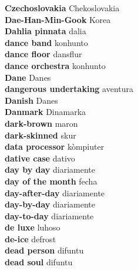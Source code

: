 \textbf{ Czechoslovakia  } Chekoslovakia \\
\textbf{ Dae-Han-Min-Gook  } Korea \\
\textbf{ Dahlia pinnata  } dalia \\
\textbf{ dance band  } konhunto \\
\textbf{ dance floor  } dansflur \\
\textbf{ dance orchestra  } konhunto \\
\textbf{ Dane  } Danes \\
\textbf{ dangerous undertaking  } aventura \\
\textbf{ Danish  } Danes \\
\textbf{ Danmark  } Dinamarka \\
\textbf{ dark-brown  } maron \\
\textbf{ dark-skinned  } skur \\
\textbf{ data processor  } kòmpiuter \\
\textbf{ dative case  } dativo \\
\textbf{ day by day  } diariamente \\
\textbf{ day of the month  } fecha \\
\textbf{ day-after-day  } diariamente \\
\textbf{ day-by-day  } diariamente \\
\textbf{ day-to-day  } diariamente \\
\textbf{ de luxe  } luhoso \\
\textbf{ de-ice  } defrost \\
\textbf{ dead person  } difuntu \\
\textbf{ dead soul  } difuntu \\
